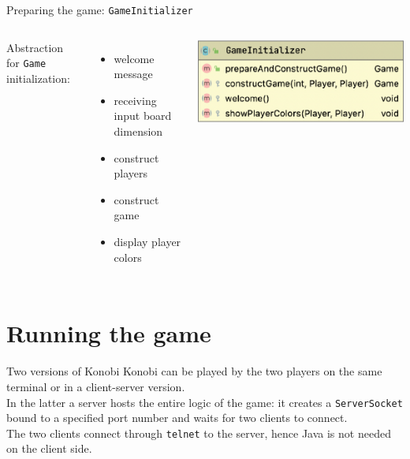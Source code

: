 \documentclass{beamer}
\begin{document}
\begin{frame}{Preparing the game: \texttt{GameInitializer}}

 \begin{columns}
    Abstraction for  \texttt{Game} initialization:
   \begin{itemize}
    \item welcome message
    \item receiving input board dimension
    \item construct players
    \item construct game
    \item display player colors
   \end{itemize}
        \includegraphics[scale=0.5]{images/gameinitializer.png}
     \end{columns}
\end{frame}

\section{Running the game}

\begin{frame}{Two versions of Konobi}
Konobi can be played by the two players on the same terminal or in a client-server version.
\\In the latter a server hosts the entire logic of the game: it creates a \texttt{ServerSocket} bound to a specified port number and waits for two clients to connect.
\vspace{0.5cm}
\\The two clients connect through \texttt{telnet} to the server, hence Java is not needed on the client side.
\end{frame}
\end{document}
